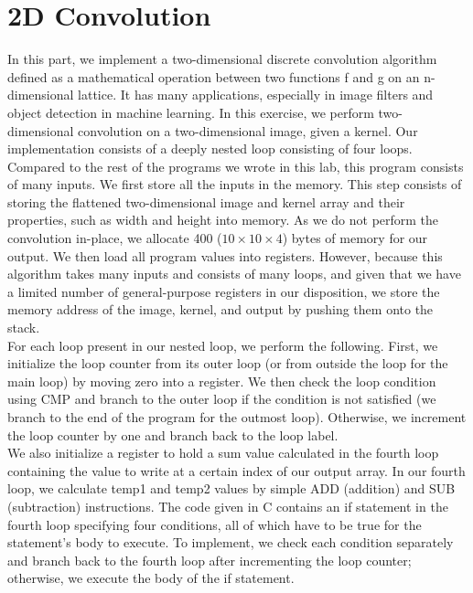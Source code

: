 \documentclass[10pt]{article}
\begin{document}
\section{2D Convolution}
In this part, we implement a two-dimensional discrete convolution algorithm defined as a mathematical operation between two functions f and g on an n-dimensional lattice. It has many applications, especially in image filters and object detection in machine learning. In this exercise, we perform two-dimensional convolution on a two-dimensional image, given a kernel. Our implementation consists of a deeply nested loop consisting of four loops.\\

Compared to the rest of the programs we wrote in this lab, this program consists of many inputs. We first store all the inputs in the memory. This step consists of storing the flattened two-dimensional image and kernel array and their properties, such as width and height into memory. As we do not perform the convolution in-place, we allocate 400 ($10\times10\times4$) bytes of memory for our output. We then load all program values into registers. However, because this algorithm takes many inputs and consists of many loops, and given that we have a limited number of general-purpose registers in our disposition, we store the memory address of the image, kernel, and output by pushing them onto the stack.\\

For each loop present in our nested loop, we perform the following. First, we initialize the loop counter from its outer loop (or from outside the loop for the main loop) by moving zero into a register. We then check the loop condition using CMP and branch to the outer loop if the condition is not satisfied (we branch to the end of the program for the outmost loop). Otherwise, we increment the loop counter by one and branch back to the loop label.\\
We also initialize a register to hold a sum value calculated in the fourth loop containing the value to write at a certain index of our output array. In our fourth loop, we calculate temp1 and temp2 values by simple ADD (addition) and SUB (subtraction) instructions. The code given in C contains an if statement in the fourth loop specifying four conditions, all of which have to be true for the statement's body to execute. To implement, we check each condition separately and branch back to the fourth loop after incrementing the loop counter; otherwise, we execute the body of the if statement.\\
\end{document}

